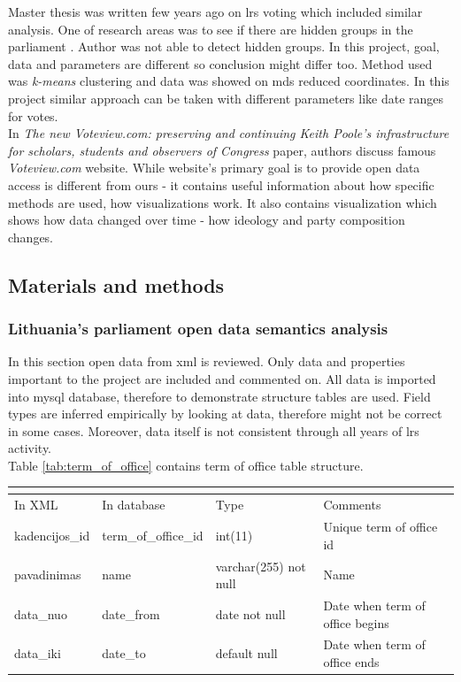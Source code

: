 \documentclass[a4paper,12pt]{article}
\begin{document}
	Master thesis was written few years ago on \gls{lrs} voting which included similar analysis. One of research areas was to see if there are hidden groups in the parliament \cite{vytautas_mick_magistrinis}. Author was not able to detect hidden groups. In this project, goal, data and parameters are different so conclusion might differ too. Method used was \textit{k-means} clustering and data was showed on \gls{mds} reduced coordinates. In this project similar approach can be taken with different parameters like date ranges for votes.  \\
	
	In \textit{The new Voteview.com: preserving and continuing Keith Poole’s infrastructure for scholars, students and observers of Congress} \cite{article} paper, authors discuss famous \textit{Voteview.com} website. While website's primary goal is to provide open data access is different from ours - it contains useful information about how specific methods are used, how visualizations work. It also contains visualization which shows how data changed over time - how ideology and party composition changes.
	
	
	
	
	\clearpage
	
	\subsection{Materials and methods}
	
	\subsubsection{Lithuania's parliament open data semantics analysis }
	
	In this section open data from \acrshort{xml} is reviewed. Only data and properties important to the project are included and commented on. All data is imported into \gls{mysql} database, therefore to demonstrate structure tables are used. Field types are inferred empirically by looking at data, therefore might not be correct in some cases. Moreover, data itself is not consistent through all years of \acrlong{lrs} activity.\\
	
	\noindent
	Table \ref{tab:term_of_office} contains term of office table structure.
	\begin{center}
		\begin{tabular}{L{3cm} L{3cm} L{2.2cm} L{3.8cm}}
			\\ 
			\hline
			In XML & In database & Type & Comments\\
			\hline 
			kadencijos\_id & term\_of\_office\_id & int(11) & Unique term of office id \\ 
			pavadinimas & name & varchar(255) not null & Name \\
			data\_nuo & date\_from & date not null & Date when term of office begins \\ 
			data\_iki & date\_to & default null & Date when term of office ends \\
			\hline
		\end{tabular}
		 \label{tab:term_of_office}
	\end{center}
	
\end{document}
